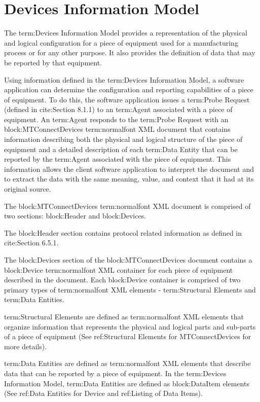 
\section{Devices Information Model}
\label{sec:Devices Information Model}
The {term:Devices Information Model} provides a representation of the physical and logical configuration for a piece of equipment used for a manufacturing process or for any other purpose.  It also provides the definition of data that may be reported by that equipment. 

Using information defined in the {term:Devices Information Model}, a software application can determine the configuration and reporting capabilities of a piece of equipment.  To do this, the software application issues a {term:Probe Request} (defined in  {cite:Section 8.1.1}) to an {term:Agent} associated with a piece of equipment. An {term:Agent} responds to the {term:Probe Request} with an {block:MTConnectDevices} {term:normalfont XML} document that contains information describing both the physical and logical structure of the piece of equipment and a detailed description of each {term:Data Entity} that can be reported by the {term:Agent} associated with the piece of equipment.   This information allows the client software application to interpret the document and to extract the data with the same meaning, value, and context that it had at its original source.  

The {block:MTConnectDevices} {term:normalfont XML} document is comprised of two sections: {block:Header} and {block:Devices}.

The {block:Header} section contains protocol related information as defined in  {cite:Section 6.5.1}.

The {block:Devices} section of the {block:MTConnectDevices} document contains a {block:Device} {term:normalfont XML} container for each piece of equipment described in the document.   Each {block:Device} container is comprised of two primary types of {term:normalfont XML} elements - {term:Structural Elements} and {term:Data Entities}.  

{term:Structural Elements} are defined as {term:normalfont XML} elements that organize information that represents the physical and logical parts and sub-parts of a piece of equipment (See {ref:Structural Elements for MTConnectDevices} for more details).  

{term:Data Entities} are defined as {term:normalfont XML} elements that describe data that can be reported by a piece of equipment.  In the {term:Devices Information Model}, {term:Data Entities} are defined as {block:DataItem} elements (See {ref:Data Entities for Device} and {ref:Listing of Data Items}).

